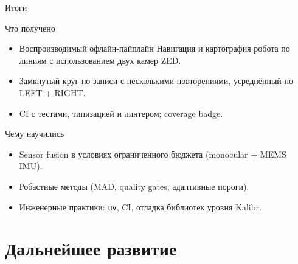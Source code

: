 \documentclass[aspectratio=169]{beamer}
\newcommand{\project}{Навигация и картография робота по линиям}
\newcommand{\code}[1]{\texttt{#1}}
\begin{document}
\begin{frame}{Итоги}
    \begin{block}{Что получено}
        \begin{itemize}
            \item Воспроизводимый офлайн-пайплайн \project{} с использованием двух камер ZED.
            \item Замкнутый круг по записи с несколькими повторениями, усреднённый по LEFT + RIGHT.
            \item CI с тестами, типизацией и линтером; coverage badge.
        \end{itemize}
    \end{block}

    \begin{block}{Чему научились}
        \begin{itemize}
            \item Sensor fusion в условиях ограниченного бюджета (monocular + MEMS IMU).
            \item Робастные методы (MAD, quality gates, адаптивные пороги).
            \item Инженерные практики: \code{uv}, CI, отладка библиотек уровня Kalibr.
        \end{itemize}
    \end{block}
\end{frame}

\section{Дальнейшее развитие}
\end{document}

